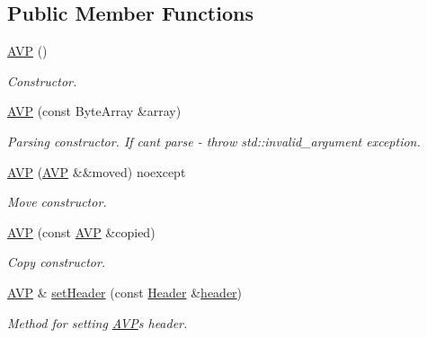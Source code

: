 \subsection*{Public Member Functions}
\begin{DoxyCompactItemize}
\item 
\mbox{\label{classDiameter_1_1AVP_a840ad7cf0c0b0b9f8d73f2ae3f65b436}} 
\hyperlink{classDiameter_1_1AVP_a840ad7cf0c0b0b9f8d73f2ae3f65b436}{A\+VP} ()
\begin{DoxyCompactList}\small\item\em Constructor. \end{DoxyCompactList}\item 
\hyperlink{classDiameter_1_1AVP_a8ff7f26ccb7c31a2342d9e1895cb5f36}{A\+VP} (const Byte\+Array \&array)
\begin{DoxyCompactList}\small\item\em Parsing constructor. If can\textquotesingle{}t parse -\/ throw std\+::invalid\+\_\+argument exception. \end{DoxyCompactList}\item 
\mbox{\label{classDiameter_1_1AVP_a24d6aa1295ec21d4e44f41be778d7a69}} 
\hyperlink{classDiameter_1_1AVP_a24d6aa1295ec21d4e44f41be778d7a69}{A\+VP} (\hyperlink{classDiameter_1_1AVP}{A\+VP} \&\&moved) noexcept
\begin{DoxyCompactList}\small\item\em Move constructor. \end{DoxyCompactList}\item 
\hyperlink{classDiameter_1_1AVP_a29fee29a78083e59cd37636f2672b037}{A\+VP} (const \hyperlink{classDiameter_1_1AVP}{A\+VP} \&copied)
\begin{DoxyCompactList}\small\item\em Copy constructor. \end{DoxyCompactList}\item 
\hyperlink{classDiameter_1_1AVP}{A\+VP} \& \hyperlink{classDiameter_1_1AVP_a1c275a3973c1d871e0653a1ab5c54499}{set\+Header} (const \hyperlink{classDiameter_1_1AVP_1_1Header}{Header} \&\hyperlink{classDiameter_1_1AVP_aa968a1e25c2b83df6ea774d67534320b}{header})
\begin{DoxyCompactList}\small\item\em Method for setting \hyperlink{classDiameter_1_1AVP}{A\+VP}\textquotesingle{}s header. \end{DoxyCompactList}\item 

\end{DoxyCompactItemize}
